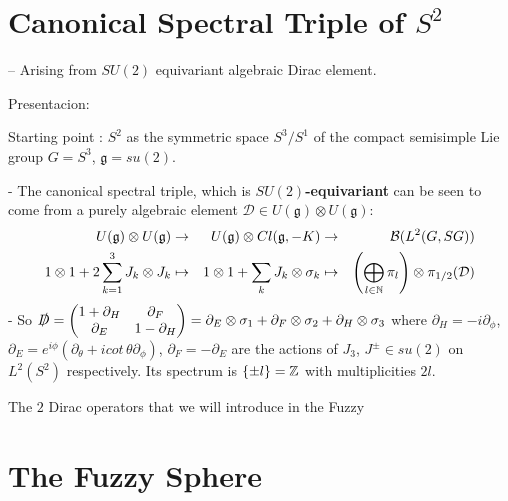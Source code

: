 \section{Canonical Spectral Triple of $S^2$}

-- Arising from $SU(2)$ equivariant algebraic Dirac element.

\linea 

Presentacion:

Starting point \cite{DAndrea2013}: $S^2$ as the symmetric space $S^3/S^1$ of the compact semisimple Lie group $G = S^3$, $\mathfrak g = su(2)$.
    
- The canonical spectral triple, which is \textbf{$SU(2)$-equivariant} can be seen to come from a purely algebraic element $\mathcal D \in U(\mathfrak g) \otimes U(\mathfrak g)$:
    \begin{align*}
        U(\mathfrak g) \otimes U(\mathfrak g) &\to& U(\mathfrak g) \otimes Cl(\mathfrak g, -K) &\to& \mathcal B(L^2(G, SG)) \\
        1 \otimes 1 + 2 \sum_{k = 1}^3 J_k \otimes J_k &\mapsto& 1 \otimes 1 + \sum_k J_k \otimes \sigma_k &\mapsto& \left( \bigoplus_{l\in \mathbb{N}} \pi_l \right) \otimes \pi_{1/2}(\mathcal D)
    \end{align*}
- So $\slashed D = \begin{pmatrix} 1 + \partial_H & \partial_F \\ \partial_E & 1 - \partial_H\end{pmatrix} = \partial_E \otimes \sigma_1 + \partial_F \otimes \sigma_2 + \partial_H \otimes \sigma_3$ where $\partial_H = -i \partial_\phi$, $\partial_E = e^{i\phi} \left( \partial_\theta + i cot\,\theta \partial_\phi \right)$, $\partial_F = -\partial_E%
$ are the actions of $J_3$, $J^\pm \in su(2)$ on $L^2(S^2)$ respectively. Its spectrum is $\{\pm l\} = \mathbb{Z}$ with multiplicities $2l$.%

\linea

The $2$ Dirac operators that we will introduce in the Fuzzy

\section{The Fuzzy Sphere}

